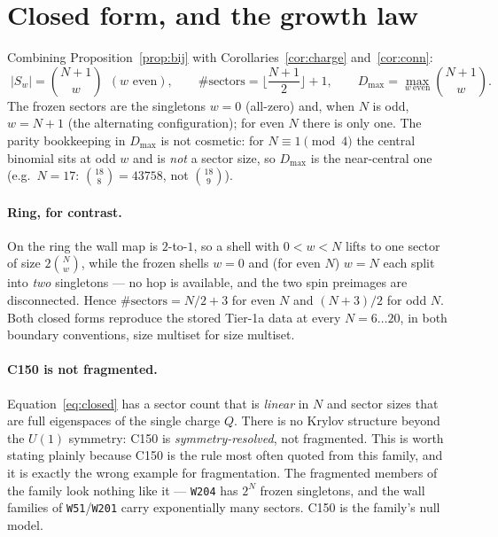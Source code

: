 \documentclass[11pt]{article}
\newcommand{\rt}[1]{\texttt{#1}}
\theoremstyle{plain}
\theoremstyle{definition}
\begin{document}
\section{Closed form, and the growth law}
\label{sec:closed}

Combining Proposition~\ref{prop:bij} with Corollaries~\ref{cor:charge}
and~\ref{cor:conn}:
\begin{equation}
  \boxed{\;
  |S_w| = \binom{N+1}{w}\ \ (w \text{ even}), \qquad
  \#\text{sectors} = \Big\lfloor \frac{N+1}{2}\Big\rfloor + 1, \qquad
  D_{\max} = \max_{w\ \mathrm{even}} \binom{N+1}{w}. \;}
  \label{eq:closed}
\end{equation}
The frozen sectors are the singletons $w=0$ (all-zero) and, when $N$ is odd,
$w=N+1$ (the alternating configuration); for even $N$ there is only one. The
parity bookkeeping in $D_{\max}$ is not cosmetic: for $N\equiv 1 \pmod 4$ the
central binomial sits at odd $w$ and is \emph{not} a sector size, so
$D_{\max}$ is the near-central one (e.g.\ $N=17$: $\binom{18}{8}=43758$, not
$\binom{18}{9}$).

\paragraph{Ring, for contrast.} On the ring the wall map is $2$-to-$1$, so a
shell with $0<w<N$ lifts to one sector of size $2\binom{N}{w}$, while the frozen
shells $w=0$ and (for even $N$) $w=N$ each split into \emph{two} singletons --- no
hop is available, and the two spin preimages are disconnected. Hence
$\#\text{sectors} = N/2+3$ for even $N$ and $(N+3)/2$ for odd $N$. Both closed
forms reproduce the stored Tier-1a data at every $N=6\ldots20$, in both boundary
conventions, size multiset for size multiset.

\paragraph{C150 is not fragmented.} Equation~\eqref{eq:closed} has a sector count
that is \emph{linear} in $N$ and sector sizes that are full eigenspaces of the
single charge $Q$. There is no Krylov structure beyond the $U(1)$ symmetry: C150
is \emph{symmetry-resolved}, not fragmented. This is worth stating plainly
because C150 is the rule most often quoted from this family, and it is exactly
the wrong example for fragmentation. The fragmented members of the family look
nothing like it --- \rt{W204} has $2^N$ frozen singletons, and the wall families
of \rt{W51}/\rt{W201} carry exponentially many sectors. C150 is the family's null
model.
\end{document}
